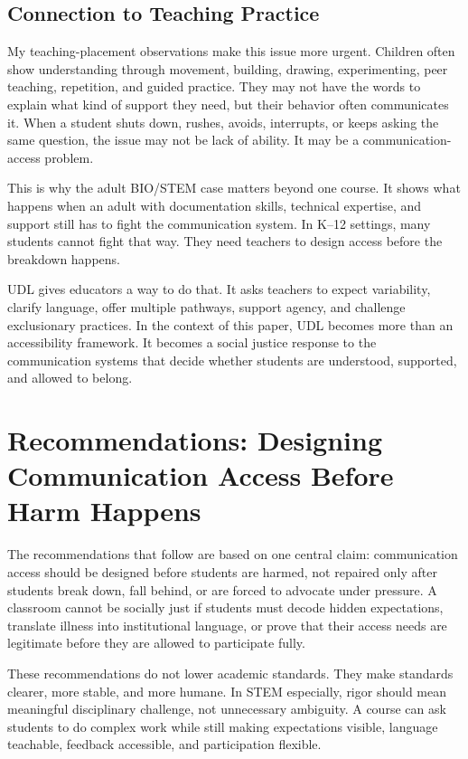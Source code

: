 \documentclass[12pt]{article}
\begin{document}
\subsection*{Connection to Teaching Practice}

My teaching-placement observations make this issue more urgent. Children often show understanding through movement, building, drawing, experimenting, peer teaching, repetition, and guided practice. They may not have the words to explain what kind of support they need, but their behavior often communicates it. When a student shuts down, rushes, avoids, interrupts, or keeps asking the same question, the issue may not be lack of ability. It may be a communication-access problem.

This is why the adult BIO/STEM case matters beyond one course. It shows what happens when an adult with documentation skills, technical expertise, and support still has to fight the communication system. In K--12 settings, many students cannot fight that way. They need teachers to design access before the breakdown happens.

UDL gives educators a way to do that. It asks teachers to expect variability, clarify language, offer multiple pathways, support agency, and challenge exclusionary practices. In the context of this paper, UDL becomes more than an accessibility framework. It becomes a social justice response to the communication systems that decide whether students are understood, supported, and allowed to belong.

\section*{Recommendations: Designing Communication Access Before Harm Happens}

The recommendations that follow are based on one central claim: communication access should be designed before students are harmed, not repaired only after students break down, fall behind, or are forced to advocate under pressure. A classroom cannot be socially just if students must decode hidden expectations, translate illness into institutional language, or prove that their access needs are legitimate before they are allowed to participate fully.

These recommendations do not lower academic standards. They make standards clearer, more stable, and more humane. In STEM especially, rigor should mean meaningful disciplinary challenge, not unnecessary ambiguity. A course can ask students to do complex work while still making expectations visible, language teachable, feedback accessible, and participation flexible.
\end{document}
